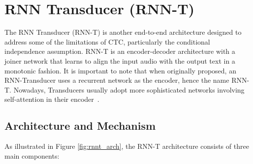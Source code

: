\section{RNN Transducer (RNN-T)}

The RNN Transducer (RNN-T) \cite{graves2012sequence} is another end-to-end architecture designed to address some of the limitations of CTC, particularly the conditional independence assumption. RNN-T is an encoder-decoder architecture with a joiner network that learns to align the input audio with the output text in a monotonic fashion. It is important to note that when originally proposed, an RNN-Transducer uses a recurrent network as the encoder, hence the name RNN-T. Nowadays, Transducers usually adopt more sophisticated networks involving self-attention in their encoder~\cite{xu2023efficient}. 

\subsection{Architecture and Mechanism}

As illustrated in Figure \ref{fig:rnnt_arch}, the RNN-T architecture consists of three main components:

